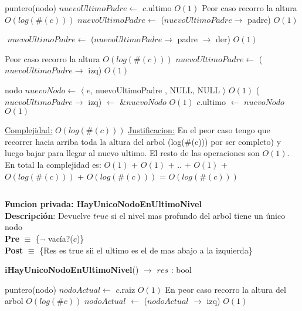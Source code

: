 \begin{Algoritmos}
\begin{algorithm}[H]
\begin{algorithmic}[1]
    \State puntero(nodo) $nuevoUltimoPadre  \gets$ $c$.ultimo \Comment $O(1)$
      \Comment Peor caso recorro la altura $O(log(\#(c)))$
        \State $nuevoUltimoPadre  \gets$ ($nuevoUltimoPadre  \to$ padre) \Comment $O(1)$
    \EndWhile
    
    \State $ $
    \State $nuevoUltimoPadre  \gets$ ($nuevoUltimoPadre  \to$ padre $\to$ der) \Comment $O(1)$
    \State $ $
    
     \Comment Peor caso recorro la altura $O(log(\#(c)))$
        \State $nuevoUltimoPadre  \gets$ ($nuevoUltimoPadre  \to$ izq) \Comment $O(1)$
    \EndWhile
    \State $ $

    \State nodo $nuevoNodo \gets$ $\langle$ $e$, nuevoUltimoPadre , NULL, NULL $\rangle$ \Comment $O(1)$
    \State ($nuevoUltimoPadre  \to$ izq) $\gets$ $\&nuevoNodo$ \Comment $O(1)$
    \State $c$.ultimo $\gets$ $nuevoNodo$ \Comment $O(1)$

    \medskip
    \Statex \underline{Complejidad:} $O(log(\#(c)))$
    \Statex \underline{Justificacion:} En el peor caso tengo que recorrer hacia arriba toda la altura del arbol (log($\#$(c))) por ser completo) y luego bajar para llegar al nuevo ultimo. El resto de las operaciones son $O(1)$. En total la complejidad es: $O(1)$ + $O(1)$ + .. + $O(1)$ + $O(log(\#(c)))$ + $O(log(\#(c)))$ = $O(log(\#(c)))$
\end{algorithmic}
\end{algorithm}

$ $\newline



\textbf{Funcion privada: HayUnicoNodoEnUltimoNivel}\\
\textbf{Descripci\'on}: Devuelve $true$ si el nivel mas profundo del arbol tiene un \'unico nodo\\
\textbf{Pre} $\equiv$ \{$\neg$ vac\'ia?($c$)\}\\%
\textbf{Post} $\equiv$ \{Res es true sii el ultimo es el de mas abajo a la izquierda\}%
\begin{algorithm}[H]
{\textbf{iHayUnicoNodoEnUltimoNivel}() $\to$ $res$ : bool}
\begin{algorithmic}[1]

    \State puntero(nodo) $nodoActual \gets$ $c$.raiz \Comment $O(1)$
     \Comment En peor caso recorro la altura del arbol $O(log(\#c))$
        \State $nodoActual$ $\gets$ ($nodoActual$ $\rightarrow$ izq) \Comment $O(1)$
    \EndWhile


\end{algorithmic}
\end{algorithm}
\end{Algoritmos}
